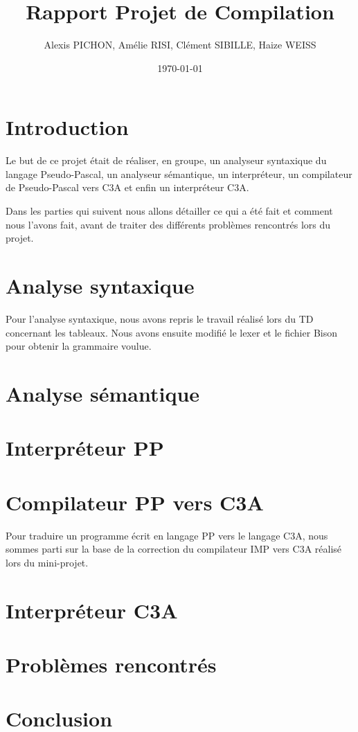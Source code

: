 \documentclass[11pt,a4paper]{article}
\title{Rapport Projet de Compilation}
\author{Alexis PICHON, Amélie RISI, Clément SIBILLE, Haize WEISS}
\date{\today}
\begin{document}
\maketitle
\tableofcontents
\pagebreak

\setlength{\parskip}{1em}
\setlength{\intextsep}{2em}


\section{Introduction}
Le but de ce projet était de réaliser, en groupe, un analyseur syntaxique du langage Pseudo-Pascal, un analyseur sémantique, un interpréteur, un compilateur de Pseudo-Pascal vers C3A et enfin un interpréteur C3A.
\par
Dans les parties qui suivent nous allons détailler ce qui a été fait et comment nous l'avons fait, avant de traiter des différents problèmes rencontrés lors du projet.
\section{Analyse syntaxique}
Pour l'analyse syntaxique, nous avons repris le travail réalisé lors du TD concernant les tableaux. Nous avons ensuite modifié le lexer et le fichier Bison pour obtenir la grammaire voulue.
\section{Analyse sémantique}
\section{Interpréteur PP}
\section{Compilateur PP vers C3A}
Pour traduire un programme écrit en langage PP vers le langage C3A, nous sommes parti sur la base de la correction du compilateur IMP vers C3A réalisé lors du mini-projet.
\section{Interpréteur C3A}
\section{Problèmes rencontrés}
\section{Conclusion}
\end{document}
